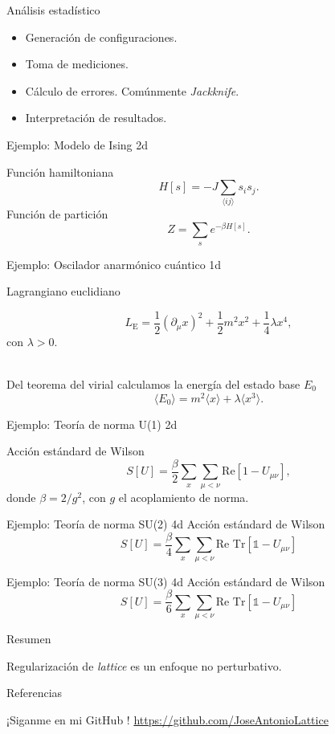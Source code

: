 \documentclass[11pt]{beamer}
\begin{document}
\begin{frame}{Análisis estadístico}

    \begin{itemize}
        \item Generación de configuraciones.
        \item Toma de mediciones.
        \item Cálculo de errores. Comúnmente \emph{Jackknife}.
        \item Interpretación de resultados.
    \end{itemize}

\end{frame}

\begin{frame}{Ejemplo: Modelo de Ising 2d}

Función hamiltoniana
$$ H[s] = -J\sum_{\langle ij \rangle} s_i s_j .$$
Función de partición
$$ Z = \sum_s e^{-\beta H[s]}.$$

\end{frame}

\begin{frame}{Ejemplo: Oscilador anarmónico cuántico 1d}

    Lagrangiano euclidiano

    $$ L_{\text{E}} = \frac{1}{2}\left(\partial_{\mu}x\right)^2 + \frac{1}{2}m^2 x^2 + \frac{1}{4}\lambda x^4,$$
con $\lambda > 0$. \\~

Del teorema del virial calculamos la energía del estado base $E_0$ 
$$ \langle E_0 \rangle = m^2\langle x \rangle + \lambda \langle x^3 \rangle. $$
\end{frame}

\begin{frame}{Ejemplo: Teoría de norma U(1) 2d}

Acción estándard de Wilson
$$ S[U] = \frac{\beta}{2}\sum_{x}\sum_{\mu < \nu} \text{Re} \left[1 - U_{\mu\nu} \right], $$
donde $\beta = 2/g^2$, con $g$ el acoplamiento de norma. 
\end{frame}

\begin{frame}{Ejemplo: Teoría de norma SU(2) 4d}
Acción estándard de Wilson
$$ S[U] = \frac{\beta}{4}\sum_{x}\sum_{\mu < \nu} \text{Re Tr} \left[\mathds{1} - U_{\mu\nu} \right] $$
\end{frame}


\begin{frame}{Ejemplo: Teoría de norma SU(3) 4d}
Acción estándard de Wilson
$$ S[U] = \frac{\beta}{6}\sum_{x}\sum_{\mu < \nu} \text{Re Tr} \left[\mathds{1} - U_{\mu\nu} \right] $$
\end{frame}


\begin{frame}{Resumen}

Regularización de \emph{lattice} es un enfoque no perturbativo.
    
\end{frame}

\begin{frame}{Referencias}

¡Siganme en mi GitHub \faGithub !
\url{https://github.com/JoseAntonioLattice}
\end{frame}
\end{document}
